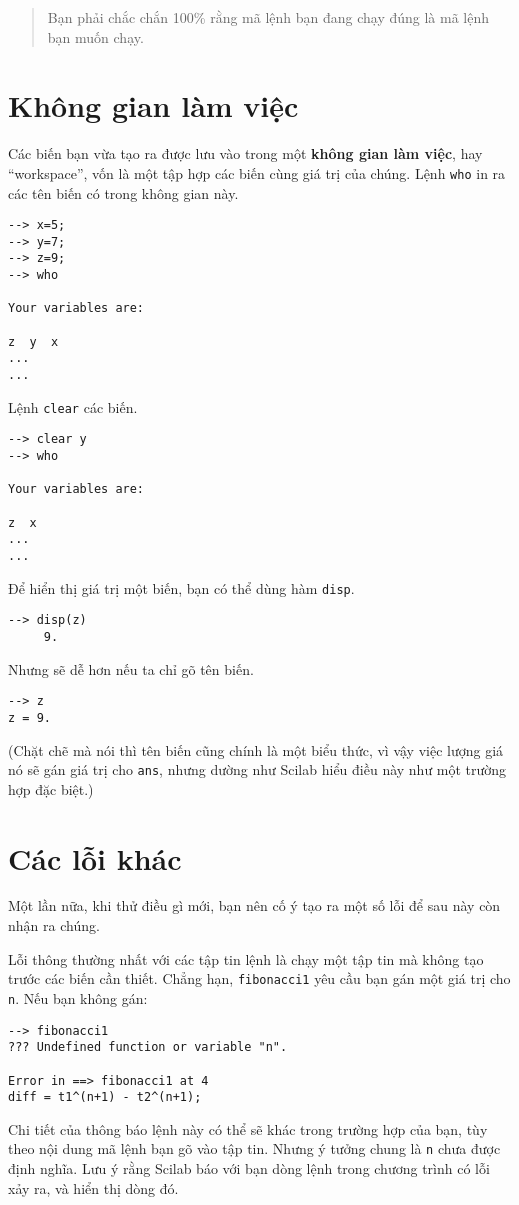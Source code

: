 \documentclass[12pt]{book}
\begin{document}
\begin{quote}
Bạn phải chắc chắn 100\% rằng mã lệnh bạn đang chạy đúng là
mã lệnh bạn muốn chạy.
\end{quote}



\section{Không gian làm việc}

Các biến bạn vừa tạo ra được lưu vào trong một {\bf không gian làm việc},
hay ``workspace'', vốn là một tập hợp các biến cùng giá trị của chúng.
Lệnh {\tt who} in ra các tên biến có trong không gian này.

\begin{verbatim}
--> x=5;
--> y=7;
--> z=9;
--> who

Your variables are:

z  y  x
...
... 
\end{verbatim}
%
Lệnh {\tt clear} các biến. 

\begin{verbatim}
--> clear y
--> who

Your variables are:

z  x 
...
...
\end{verbatim}
%
Để hiển thị giá trị một biến, bạn có thể dùng hàm {\tt disp}.

\begin{verbatim}
--> disp(z)
     9.
\end{verbatim}
%
Nhưng sẽ dễ hơn nếu ta chỉ gõ tên biến.

\begin{verbatim}
--> z
z = 9.
\end{verbatim}
%
(Chặt chẽ mà nói thì tên biến cũng chính là một biểu thức, vì vậy
việc lượng giá nó sẽ gán giá trị cho {\tt ans}, nhưng dường như 
Scilab hiểu điều này như một trường hợp đặc biệt.)


\section{Các lỗi khác}

Một lần nữa, khi thử điều gì mới, bạn nên cố ý tạo ra một số lỗi để
sau này còn nhận ra chúng.

Lỗi thông thường nhất với các tập tin lệnh là chạy một tập tin mà
không tạo trước các biến cần thiết. Chẳng hạn, {\tt fibonacci1} yêu cầu
bạn gán một giá trị cho {\tt n}. Nếu bạn không gán:

\begin{verbatim}
--> fibonacci1
??? Undefined function or variable "n".

Error in ==> fibonacci1 at 4
diff = t1^(n+1) - t2^(n+1);
\end{verbatim}
Chi tiết của thông báo lệnh này có thể sẽ khác trong trường hợp của
bạn, tùy theo nội dung mã lệnh bạn gõ vào tập tin. Nhưng ý tưởng chung
là {\tt n} chưa được định nghĩa. Lưu ý rằng Scilab báo với bạn dòng
lệnh trong chương trình có lỗi xảy ra, và hiển thị dòng đó.
\end{document}
